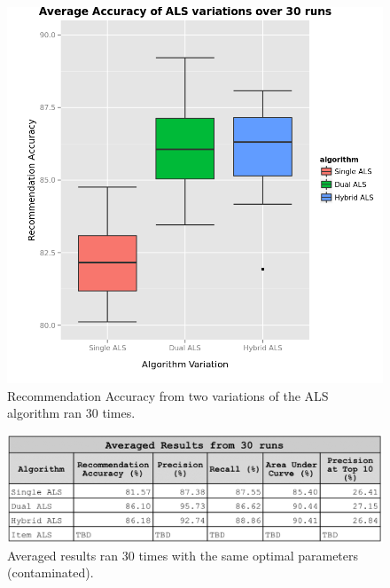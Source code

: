 \begin{figure}
\centering
\includegraphics[scale=0.7]{images/contaminated_accuracy.png}
\caption{Recommendation Accuracy from two variations of the ALS algorithm ran 30 times.}
\label{fig:algorithms}
\end{figure}


\begin{figure}
\centering
\includegraphics[scale=0.4]{images/results_tuning.png}
\caption{Averaged results ran 30 times with the same optimal parameters (contaminated).}
\label{fig:results}
\end{figure}


